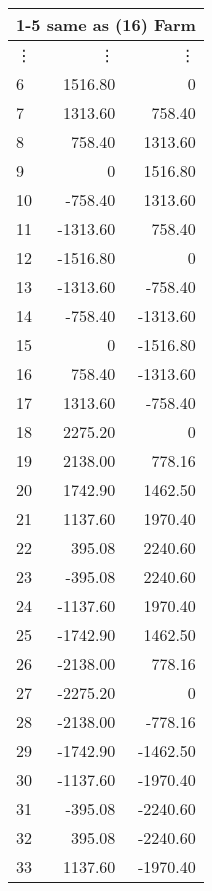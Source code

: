 \documentclass[12pt]{article}
\begin{document}
\begin{table}[H]
\begin{minipage}[t]{.33\linewidth}
{\begin{tabular}{@{}|l|r|r|@{}}
    	\hline
    	\multicolumn{3}{|c|}{1-5 same as (16) Farm}\\
    	\hline
    	\vdots & \vdots & \vdots \\
    	\hline
    	\hline
    	6 & 1516.80 & 0 \\ 
    	\hline
        7 & 1313.60 & 758.40 \\ 
    	\hline
        8 & 758.40 & 1313.60 \\ 
    	\hline
        9 & 0 & 1516.80 \\
    	\hline
        10 & -758.40 & 1313.60 \\ 
    	\hline
        11 & -1313.60 & 758.40 \\ 
        \hline
        12 & -1516.80 & 0 \\ 
    	\hline
        13 & -1313.60 & -758.40 \\
    	\hline
        14 & -758.40 & -1313.60 \\
    	\hline
        15 & 0 & -1516.80 \\
        \hline
        16 & 758.40 & -1313.60 \\
    	\hline
        17 & 1313.60 & -758.40 \\ 
    	\hline
    	\hline
        18 & 2275.20 & 0 \\ 
    	\hline
        19 & 2138.00 & 778.16 \\ 
    	\hline
        20 & 1742.90 & 1462.50 \\
        \hline
        21 & 1137.60 & 1970.40 \\ 
        \hline
        22 & 395.08 & 2240.60 \\ 
    	\hline
        23 & -395.08 & 2240.60 \\ 
    	\hline
        24 & -1137.60 & 1970.40 \\ 
    	\hline
        25 & -1742.90 & 1462.50 \\ 
    	\hline
        26 & -2138.00 & 778.16 \\ 
    	\hline
        27 & -2275.20 & 0 \\ 
    	\hline
        28 & -2138.00 & -778.16 \\ 
    	\hline
        29 & -1742.90 & -1462.50 \\ 
    	\hline
        30 & -1137.60 & -1970.40 \\ 
        \hline
        31 & -395.08 & -2240.60 \\ 
        \hline
        32 & 395.08 & -2240.60 \\ 
    	\hline
        33 & 1137.60 & -1970.40 \\ 

\end{tabular}}
\end{minipage}
\end{table}
\end{document}
